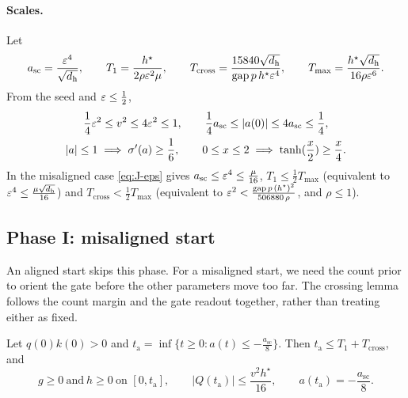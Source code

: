 \paragraph{Scales.} Let
\[
 a_{\mathrm{sc}}=\frac{\varepsilon^4}{\sqrt{d_{\mathrm h}}},\qquad T_1=\frac{h^\star}{2\rho\varepsilon^2\mu},\qquad
 T_{\mathrm{cross}}=\frac{15840\sqrt{d_{\mathrm h}}}{\mathrm{gap}\,p\,h^\star\varepsilon^4},\qquad T_{\max}=\frac{h^\star\sqrt{d_{\mathrm h}}}{16\rho\varepsilon^6}.
\]
From the seed and $\varepsilon\le\frac{1}{2}$,
\begin{equation}
 \begin{gathered}
 \tfrac{1}{4}\initscale^2\le v^2\le4\initscale^2\le1,\qquad \tfrac{1}{4}a_{\mathrm{sc}}\le|a(0)|\le4a_{\mathrm{sc}}\le\tfrac{1}{4},\\
 |a|\le1\implies\sigma'(a)\ge\tfrac{1}{6},\qquad 0\le x\le2\implies\tanh(\tfrac{x}{2})\ge\tfrac{x}{4} .
 \end{gathered}
 \label{eq:J-scales}
\end{equation}
In the misaligned case \cref{eq:J-eps} gives $a_{\mathrm{sc}}\le\varepsilon^4\le\frac{\mu}{16}$, $T_1\le\frac{1}{2}T_{\max}$ (equivalent to $\varepsilon^4\le\frac{\mu\sqrt{d_{\mathrm h}}}{16}$) and
$T_{\mathrm{cross}}<\frac{1}{2}T_{\max}$ (equivalent to $\varepsilon^2<\frac{\mathrm{gap}\,p\,(h^\star)^2}{506880\,\rho}$, and $\rho\le1$).

\subsection{Phase I: misaligned start}

An aligned start skips this phase. For a misaligned start, we need the count prior to orient the gate before the other parameters
move too far. The crossing lemma follows the count margin and the gate readout together, rather than treating either as fixed.

\begin{lemma}[Crossing]
\label{lem:J-cross}
Let $q(0)k(0)>0$ and $t_{\mathrm a}=\inf\{t\ge0:a(t)\le-\frac{a_{\mathrm{sc}}}{8}\}$. Then $t_{\mathrm a}\le T_1+T_{\mathrm{cross}}$, and
\[
 g\ge0\ \text{and}\ h\ge0\ \text{on }[0,t_{\mathrm a}],\qquad |Q(t_{\mathrm a})|\le\frac{v^2h^\star}{16},\qquad a(t_{\mathrm a})=-\frac{a_{\mathrm{sc}}}{8}.
\]
\end{lemma}

